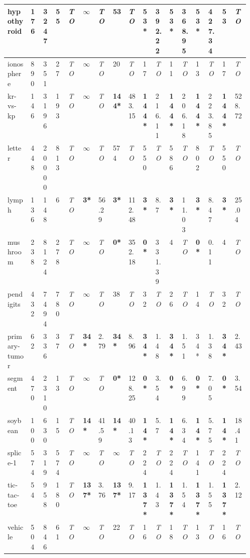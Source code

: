 \begin{table*}
\begin{tabular}{|L{0.08\linewidth}|*{10}{C{0.03\linewidth}|}|*{2}{C{0.03\linewidth}|}|*{2}{C{0.03\linewidth}|}|*{2}{C{0.03\linewidth}|}}
		\hline
		hypothyroid	& 176	& 3247	& 55	& \emph{TO}	& $\infty$	& \emph{TO}	& 53	& \emph{TO}	&\bf 53*	& 392.22	&\bf 53*	& 368.95	&\bf 53*	& 427.34	& 53	& \emph{TO}	    \\
		\hline
		ionosphere	& 890	& 351	& 27	& \emph{TO}	& $\infty$	& \emph{TO}	& 20	& \emph{TO}	& 17	& \emph{TO}	& 11	& \emph{TO}	& 13	& \emph{TO}	& 17	& \emph{TO}       \\
		\hline
		kr-vs-kp	& 146	& 3196	& 193	& \emph{TO}	& $\infty$	& \emph{TO}	&\bf 144*	& 483.15	&\bf 144*	& 216.11	&\bf 144*	& 206.18	&\bf 144*	& 223.85	&\bf 144*	& 528.72        \\
		\hline
		letter	& 448	& 20000	& 813	& \emph{TO}	& $\infty$	& \emph{TO}	& 574	& \emph{TO}	& 550	& \emph{TO}	& 586	& \emph{TO}	& 802	& \emph{TO}	& 550	& \emph{TO}       \\
		\hline
		lymph	& 136	& 148	& 6	& \emph{TO}	&\bf 3*	& 56.29	&\bf 3*	& 112.48	&\bf 3*	& 8.7	&\bf 3*	& 11.03	&\bf 3*	& 8.47	&\bf 3*	& 25.04     \\\hline
		mushroom	& 238	& 8124	& 278	& \emph{TO}	& $\infty$	& \emph{TO}	&\bf 0*	& 352.18	&\bf 0*	& 331.39	& 4	& \emph{TO}	&\bf 0*	& 0.11	& 4	& \emph{TO}	    \\
		\hline
		pendigits	& 432	& 7494	& 780	& \emph{TO}	& $\infty$	& \emph{TO}	& 38	& \emph{TO}	& 32	& \emph{TO}	& 26	& \emph{TO}	& 14	& \emph{TO}	& 32	& \emph{TO}       \\
		\hline
		primary-tumor	& 62	& 336	& 37	& \emph{TO}	&\bf 34*	& 2.79	&\bf 34*	& 8.96	&\bf 34*	& 1.48	& \bf34*	& 1.51	& 34*	& 1.38	&\bf 34*	& 2.43      \\
		\hline
		segment	& 470	& 2310	& 13	& \emph{TO}	& $\infty$	& \emph{TO}	&\bf 0*	& 128.25	&\bf 0*	& 3.54	&\bf 0*	& 6.99	&\bf 0*	& 7.05	&\bf 0*	& 3.54      \\
		\hline
		soybean	& 100	& 630	& 15	& \emph{TO}	&\bf 14*	& 41.59	&\bf 14*	& 40.13	&\bf 14*	& 5.7	&\bf 14*	& 6.34	&\bf 14*	& 5.75	&\bf 14*	& 18.41     \\
		\hline
		splice-1	& 574	& 319	& 574	& \emph{TO}	& $\infty$	& \emph{TO}	& $\infty$	& \emph{TO}	& 224	& \emph{TO}	& 224	& \emph{TO}	& 141	& \emph{TO}	& 224	& \emph{TO}       \\
		\hline
		tic-tac-toe	& 54	& 958	& 180	& \emph{TO}	&\bf 137*	& 3.76	&\bf 137*	& 9.17	&\bf 137*	& 1.43	&\bf 137*	& 1.54	&\bf 137*	& 1.55	&\bf 137*	& 2.12      \\
		\hline
		vehicle	& 504	& 846	& 61	& \emph{TO}	& $\infty$	& \emph{TO}	& 22	& \emph{TO}	& 16	& \emph{TO}	& 18	& \emph{TO}	& 13	& \emph{TO}	& 16	& \emph{TO}       \\

\end{tabular}
\end{table*}

